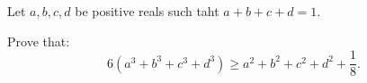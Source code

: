 Let $a,b,c,d$ be positive reals such taht $a+b+c+d=1$.

Prove that: \[6(a^{3}+b^{3}+c^{3}+d^{3})\geq a^{2}+b^{2}+c^{2}+d^{2}+\frac{1}{8}.\]